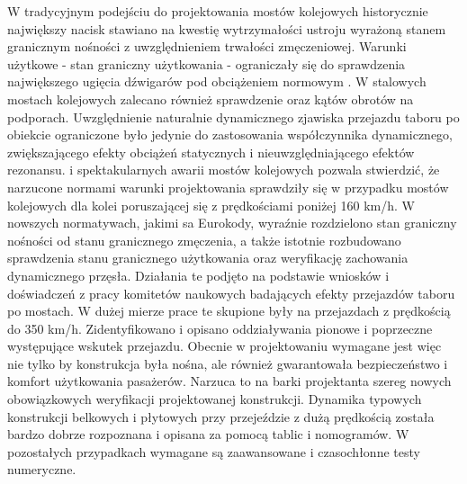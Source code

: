 W tradycyjnym podejściu do projektowania mostów kolejowych historycznie największy nacisk stawiano na kwestię wytrzymałości ustroju wyrażoną stanem granicznym nośności z uwzględnieniem trwałości zmęczeniowej. Warunki użytkowe - stan graniczny użytkowania - ograniczały się do sprawdzenia największego ugięcia dźwigarów pod obciążeniem normowym \parencite{PKNf}. W stalowych mostach kolejowych zalecano również sprawdzenie  oraz kątów obrotów na podporach. Uwzględnienie naturalnie dynamicznego zjawiska przejazdu taboru po obiekcie ograniczone było jedynie do zastosowania współczynnika dynamicznego, zwiększającego efekty obciążeń statycznych i nieuwzględniającego efektów rezonansu.  i spektakularnych awarii mostów kolejowych pozwala stwierdzić, że narzucone normami warunki projektowania sprawdziły się w przypadku mostów kolejowych dla kolei poruszającej się z prędkościami poniżej 160 km/h. W nowszych normatywach, jakimi sa Eurokody, wyraźnie rozdzielono stan graniczny nośności od stanu granicznego zmęczenia, a także istotnie rozbudowano sprawdzenia stanu granicznego użytkowania oraz weryfikację zachowania dynamicznego przęsła. Działania te podjęto na podstawie wniosków i doświadczeń z pracy komitetów naukowych badających efekty przejazdów taboru po mostach. W dużej mierze prace te skupione były na przejazdach z prędkością do 350 km/h. Zidentyfikowano i opisano oddziaływania pionowe i poprzeczne występujące wskutek przejazdu. Obecnie w projektowaniu wymagane jest więc nie tylko by konstrukcja była nośna, ale również gwarantowała bezpieczeństwo i komfort użytkowania pasażerów. Narzuca to na barki projektanta szereg nowych obowiązkowych weryfikacji projektowanej konstrukcji. Dynamika typowych konstrukcji belkowych i płytowych przy przejeździe z dużą prędkością została bardzo dobrze rozpoznana i opisana za pomocą tablic i nomogramów. W pozostałych przypadkach wymagane są zaawansowane i czasochłonne testy numeryczne. 

